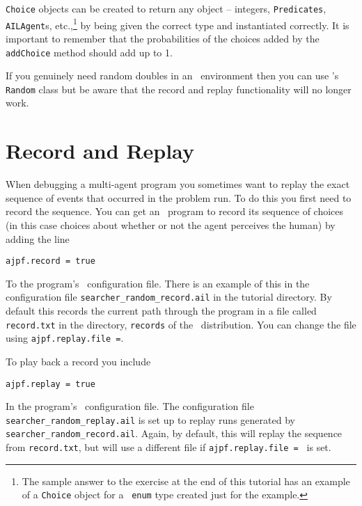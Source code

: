 \texttt{Choice} objects can be created to return any object -- integers, \texttt{Predicates}, \texttt{AILAgent}s, etc.,\footnote{The sample answer to the exercise at the end of this tutorial has an example of a \texttt{Choice} object for a \java\ \texttt{enum} type created just for the example.} by being given the correct type and instantiated correctly.  It is important to remember that the probabilities of the choices added by the \texttt{addChoice} method should add up to 1.

If you genuinely need random doubles in an \ail\ environment then you can use \java's \texttt{Random} class but be aware that the record and replay functionality will no longer work.

\section{Record and Replay}
When debugging a multi-agent program you sometimes want to replay the exact sequence of events that occurred in the  problem run.  To do this you first need to record the sequence.  You can get an \ail\ program to record its sequence of choices (in this case choices about whether or not the agent perceives the human) by adding the line

\begin{verbatim}
ajpf.record = true
\end{verbatim}

\begin{sloppypar}
To the program's \ail\ configuration file.  There is an example of this in the configuration file \texttt{searcher\_random\_record.ail} in the tutorial directory.  By default this records the current path through the program in a file called \texttt{record.txt} in the directory, \texttt{records} of the \mcapl\ distribution.  You can change the file using \texttt{ajpf.replay.file =}.  
\end{sloppypar}

To play back a record you include
\begin{verbatim}
ajpf.replay = true
\end{verbatim}
\begin{sloppypar}
In the program's \ail\ configuration file.  The configuration file \texttt{searcher\_random\_replay.ail} is set up to replay runs generated by \texttt{searcher\_random\_record.ail}.  Again, by default, this will replay the sequence from \texttt{record.txt}, but will use a different file if \texttt{ajpf.replay.file = } is set.  
\end{sloppypar}

